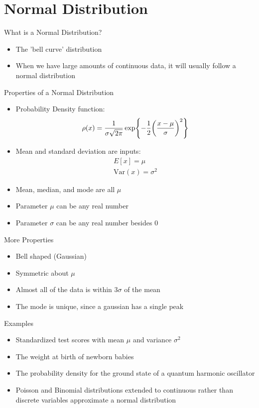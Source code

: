 \documentclass{beamer}
\begin{document}
\section{Normal Distribution}
\begin{frame}{What is a Normal Distribution?}
  \begin{itemize}
  \item The 'bell curve' distribution
  \item When we have large amounts of continuous data, it will usually follow a normal distribution
  \end{itemize}
\end{frame}
\begin{frame}{Properties of a Normal Distribution}
  \begin{itemize}
  \item Probability Density function:
    \begin{equation*}
      \rho(x)=\frac{1}{\sigma\sqrt{2\pi}}
      \exp{-\frac12\qty(\frac{x-\mu}\sigma)^2}
    \end{equation*}
  \item Mean and standard deviation are inputs:
    \begin{gather*}
      E[x]= \mu\\
      \mathrm{Var}(x)=\sigma^2
    \end{gather*}
  \item Mean, median, and mode are all $\mu$
  \item Parameter $\mu$ can be any real number
  \item Parameter $\sigma$ can be any real number besides $0$
  \end{itemize}
\end{frame}
\begin{frame}{More Properties}
  \begin{itemize}
  \item Bell shaped (Gaussian)
  \item Symmetric about $\mu$
  \item Almost all of the data is within $3\sigma$ of the mean
  \item The mode is unique, since a gaussian has a single peak
  \end{itemize}
\end{frame}
\begin{frame}{Examples}
  \begin{itemize}
  \item Standardized test scores with mean $\mu$ and variance $\sigma^2$
  \item The weight at birth of newborn babies 
  \item The probability density for the ground state of a quantum harmonic oscillator
  \item Poisson and Binomial distributions extended to continuous rather than discrete variables approximate a normal distribution
  \end{itemize}
\end{frame}
\end{document}
